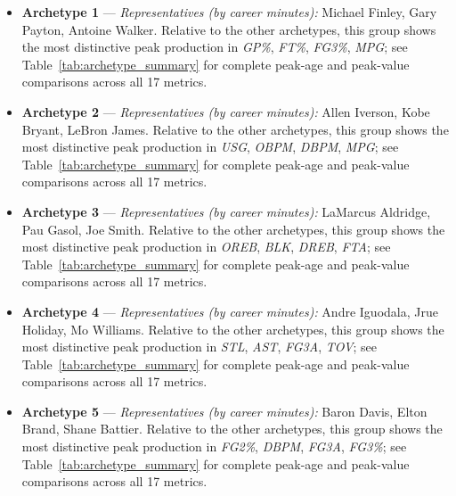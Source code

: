 \begin{itemize}
\item \textbf{Archetype 1} --- \emph{Representatives (by career minutes):} Michael Finley, Gary Payton, Antoine Walker. Relative to the other archetypes, this group shows the most distinctive peak production in \textit{GP\%}, \textit{FT\%}, \textit{FG3\%}, \textit{MPG}; see Table~\ref{tab:archetype_summary} for complete peak-age and peak-value comparisons across all 17 metrics.
\item \textbf{Archetype 2} --- \emph{Representatives (by career minutes):} Allen Iverson, Kobe Bryant, LeBron James. Relative to the other archetypes, this group shows the most distinctive peak production in \textit{USG}, \textit{OBPM}, \textit{DBPM}, \textit{MPG}; see Table~\ref{tab:archetype_summary} for complete peak-age and peak-value comparisons across all 17 metrics.
\item \textbf{Archetype 3} --- \emph{Representatives (by career minutes):} LaMarcus Aldridge, Pau Gasol, Joe Smith. Relative to the other archetypes, this group shows the most distinctive peak production in \textit{OREB}, \textit{BLK}, \textit{DREB}, \textit{FTA}; see Table~\ref{tab:archetype_summary} for complete peak-age and peak-value comparisons across all 17 metrics.
\item \textbf{Archetype 4} --- \emph{Representatives (by career minutes):} Andre Iguodala, Jrue Holiday, Mo Williams. Relative to the other archetypes, this group shows the most distinctive peak production in \textit{STL}, \textit{AST}, \textit{FG3A}, \textit{TOV}; see Table~\ref{tab:archetype_summary} for complete peak-age and peak-value comparisons across all 17 metrics.
\item \textbf{Archetype 5} --- \emph{Representatives (by career minutes):} Baron Davis, Elton Brand, Shane Battier. Relative to the other archetypes, this group shows the most distinctive peak production in \textit{FG2\%}, \textit{DBPM}, \textit{FG3A}, \textit{FG3\%}; see Table~\ref{tab:archetype_summary} for complete peak-age and peak-value comparisons across all 17 metrics.
\end{itemize}
